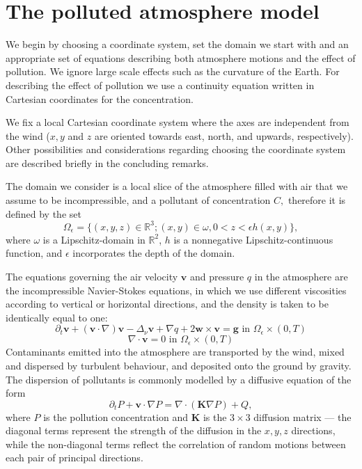 \documentclass[11pt]{article}
\begin{document}
\section{The polluted atmosphere model} \label{eqsdescribingatmpluspollution}

We begin by choosing a coordinate system, set the domain we start with and an appropriate set of equations describing both atmosphere motions and the effect of pollution. We ignore large scale effects such as the curvature of the Earth. For describing the effect of pollution we use a continuity equation written in Cartesian coordinates for the concentration.

We fix a local Cartesian coordinate system where the axes are independent from the wind ($x, y$ and $z$ are oriented towards east, north, and upwards, respectively). Other possibilities and considerations regarding choosing the coordinate system are described briefly in the concluding remarks.

The domain we consider is a local slice of the atmosphere filled with air that we assume to be incompressible, and a pollutant of concentration $C,$ therefore it is defined by the set
%
\begin{equation}
\Omega_{\epsilon} = \{(x,y,z) \in \mathbb{R}^3 ; (x,y) \in \omega, 0 < z < \epsilon h(x,y) \},
\end{equation}
%
where $\omega$ is a Lipschitz-domain in $\mathbb{R}^2$, $h$ is a nonnegative Lipschitz-continuous function, and $\epsilon$ incorporates the depth of the domain.

The equations governing the air velocity $\mathbf{v}$ and pressure $q$ in the atmosphere are the incompressible Navier-Stokes equations, in which we use different viscosities according to vertical or horizontal directions, and the density is taken to be identically equal to one:
%
\begin{equation} \label{originalEQ-V}
\partial_t \mathbf{v} + (\mathbf{v} \cdot \nabla)\mathbf{v} -\Delta_{\nu} \mathbf{v} + \nabla q + 2 \mathbf{w} \times \mathbf{v}= \mathbf{g} \text{ in } \Omega_{\epsilon} \times (0,T)
\end{equation}
%
\begin{equation} \label{originalEQ-I}
\nabla \cdot \mathbf{v} = 0 \text{ in } \Omega_{\epsilon} \times (0,T)
\end{equation}
%
Contaminants emitted into the atmosphere are transported by the wind, mixed and dispersed by turbulent behaviour, and deposited onto the ground by gravity. The dispersion of pollutants is commonly modelled by a diffusive equation of the form
%
\begin{equation} \label{diffusive}
\partial_t P + \mathbf{v} \cdot \nabla P = \nabla \cdot (\mathbf{K} \nabla P) + Q,
\end{equation}
%
where $P$ is the pollution concentration and $\mathbf{K}$ is the $3 \times 3$ diffusion matrix --- the diagonal terms represent the strength of the diffusion in the $x, y, z$ directions, while the non-diagonal terms reflect the correlation of random motions between each pair of principal directions.
\end{document}
